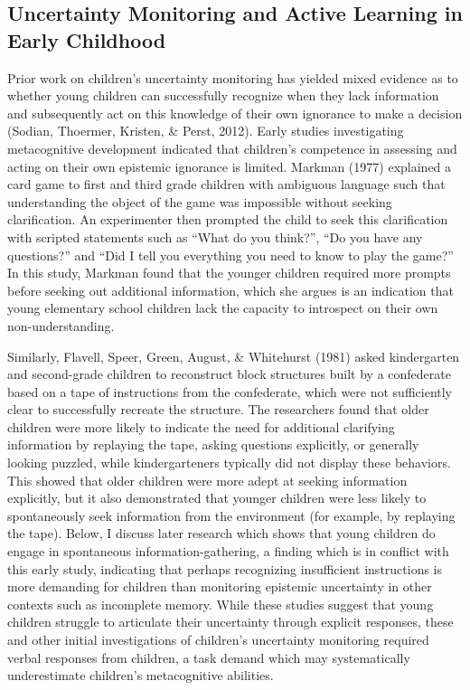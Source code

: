 \documentclass[man]{apa6}
\theoremstyle{definition}
\theoremstyle{definition}
\theoremstyle{definition}
\theoremstyle{remark}
\begin{document}
\subsection{Uncertainty Monitoring and Active Learning in Early
Childhood}\label{uncertainty-monitoring-and-active-learning-in-early-childhood}

Prior work on children's uncertainty monitoring has yielded mixed
evidence as to whether young children can successfully recognize when
they lack information and subsequently act on this knowledge of their
own ignorance to make a decision (Sodian, Thoermer, Kristen, \& Perst,
2012). Early studies investigating metacognitive development indicated
that children's competence in assessing and acting on their own
epistemic ignorance is limited. Markman (1977) explained a card game to
first and third grade children with ambiguous language such that
understanding the object of the game was impossible without seeking
clarification. An experimenter then prompted the child to seek this
clarification with scripted statements such as \enquote{What do you
think?}, \enquote{Do you have any questions?} and \enquote{Did I tell
you everything you need to know to play the game?} In this study,
Markman found that the younger children required more prompts before
seeking out additional information, which she argues is an indication
that young elementary school children lack the capacity to introspect on
their own non-understanding.

Similarly, Flavell, Speer, Green, August, \& Whitehurst (1981) asked
kindergarten and second-grade children to reconstruct block structures
built by a confederate based on a tape of instructions from the
confederate, which were not sufficiently clear to successfully recreate
the structure. The researchers found that older children were more
likely to indicate the need for additional clarifying information by
replaying the tape, asking questions explicitly, or generally looking
puzzled, while kindergarteners typically did not display these
behaviors. This showed that older children were more adept at seeking
information explicitly, but it also demonstrated that younger children
were less likely to spontaneously seek information from the environment
(for example, by replaying the tape). Below, I discuss later research
which shows that young children do engage in spontaneous
information-gathering, a finding which is in conflict with this early
study, indicating that perhaps recognizing insufficient instructions is
more demanding for children than monitoring epistemic uncertainty in
other contexts such as incomplete memory. While these studies suggest
that young children struggle to articulate their uncertainty through
explicit responses, these and other initial investigations of children's
uncertainty monitoring required verbal responses from children, a task
demand which may systematically underestimate children's metacognitive
abilities.
\end{document}
